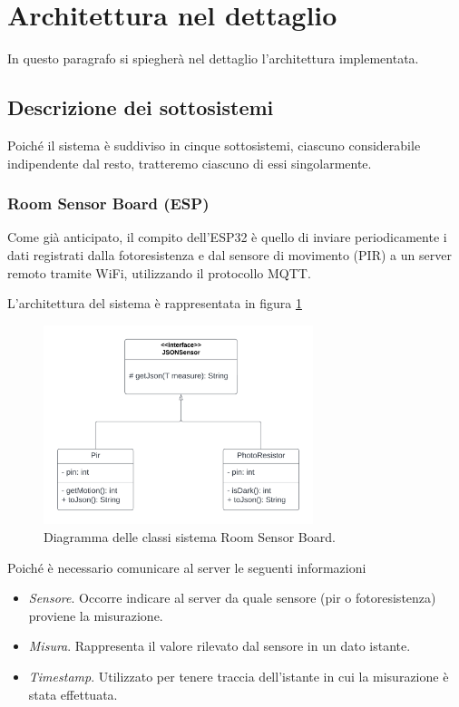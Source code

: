 \documentclass[a4paper,12pt]{report}
\begin{document}
\section{Architettura nel dettaglio}
In questo paragrafo si spiegherà nel dettaglio l'architettura implementata.
\subsection{Descrizione dei sottosistemi}
Poiché il sistema è suddiviso in cinque sottosistemi, ciascuno considerabile indipendente dal resto, tratteremo ciascuno di essi singolarmente.

\subsubsection{Room Sensor Board (ESP)}
Come già anticipato, il compito dell'ESP32 è quello di inviare periodicamente i dati registrati dalla fotoresistenza e dal sensore di movimento (PIR) a un server remoto tramite WiFi, utilizzando il protocollo MQTT.

L'architettura del sistema è rappresentata in figura \ref{fig:espclassi}

\begin{figure}[H]
    \centering
    \includegraphics[width=0.7\textwidth]{img/Classi - esp.png}
    \caption{Diagramma delle classi sistema Room Sensor Board.}
    \label{fig:espclassi}
\end{figure}

Poiché è necessario comunicare al server le seguenti informazioni
\begin{itemize}
    \item \emph{Sensore}. Occorre indicare al server da quale sensore (pir o fotoresistenza) proviene la misurazione.
    \item \emph{Misura}. Rappresenta il valore rilevato dal sensore in un dato istante.
    \item \emph{Timestamp}. Utilizzato per tenere traccia dell'istante in cui la misurazione è stata effettuata.
\end{itemize}
\end{document}
